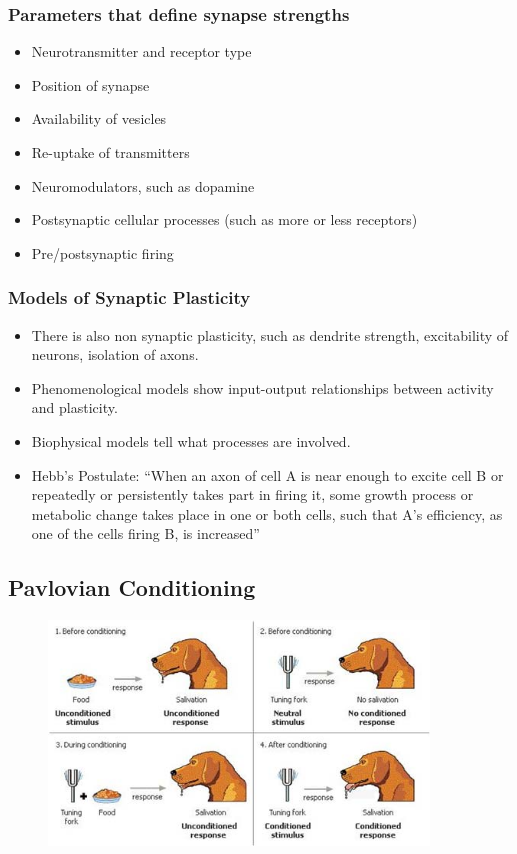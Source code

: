 \documentclass[a4paper, 12pt]{article}
\begin{document}
\subsubsection{Parameters that define synapse strengths}
\begin{itemize}[noitemsep,nolistsep]
	\item Neurotransmitter and receptor type
	\item Position of synapse
	\item Availability of vesicles
	\item Re-uptake of transmitters
	\item Neuromodulators, such as dopamine
	\item Postsynaptic cellular processes (such as more or less receptors)
	\item Pre/postsynaptic firing
\end{itemize}

\subsubsection{Models of Synaptic Plasticity}
\begin{itemize}[noitemsep,nolistsep]
	\item There is also non synaptic plasticity, such as dendrite strength, excitability of neurons, isolation of axons.
	\item Phenomenological models show input-output relationships between activity and plasticity.
	\item Biophysical models tell what processes are involved.
	\item Hebb's Postulate: ``When an axon of cell A is near enough to excite cell B or repeatedly or persistently takes part in firing it, some growth process or metabolic change takes place in one or both cells, such that A's efficiency, as one of the cells firing B, is increased''
\end{itemize}

\subsection{Pavlovian Conditioning}
\begin{figure}
	\includegraphics[width=0.9\textwidth]{pavlovian-conditioning.png}
\end{figure}
\end{document}
